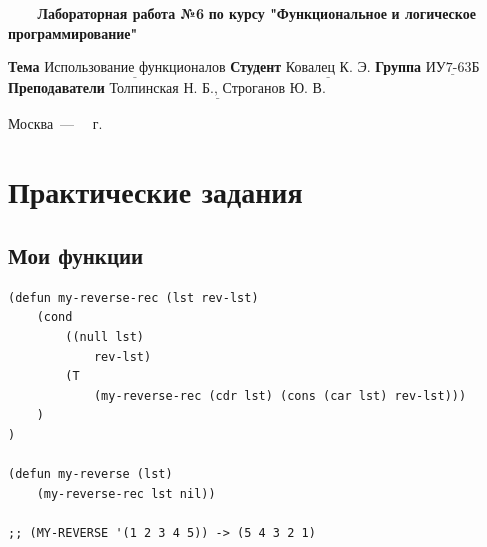 \documentclass[a4paper,14pt, unknownkeysallowed]{extreport}
\begin{document}
\begin{titlepage}
	
	\begin{center}
		\noindent\begin{minipage}{1.3\textwidth}\centering
		\Large\textbf{   ~~~ Лабораторная работа №6}\newline
		\textbf{по курсу "Функциональное}\newline
		\textbf{и логическое программирование"}\newline\newline\newline
		\end{minipage}
	\end{center}
	
	\noindent\textbf{Тема} 			$\underline{\text{Использование функционалов}}$\newline\newline
	\noindent\textbf{Студент} 		$\underline{\text{Ковалец К. Э.}}$\newline\newline
	\noindent\textbf{Группа} 		$\underline{\text{ИУ7-63Б}}$\newline\newline
	\noindent\textbf{Преподаватели} $\underline{\text{Толпинская Н. Б., Строганов Ю. В.}}$\newline
	
	\begin{center}
		\vfill
		Москва~---~\the\year
		~г.
	\end{center}
	\restoregeometry
\end{titlepage}



\setcounter{page}{2}

\chapter{Практические задания}


\section{Мои функции}

\begin{center}
\captionsetup{justification=raggedright,singlelinecheck=off}
\begin{lstlisting}[label=lst:parallel_processing,caption=my-reverse]
(defun my-reverse-rec (lst rev-lst)
	(cond 
		((null lst)
			rev-lst)
		(T 
			(my-reverse-rec (cdr lst) (cons (car lst) rev-lst)))
	)
)

(defun my-reverse (lst)
	(my-reverse-rec lst nil))

;; (MY-REVERSE '(1 2 3 4 5)) -> (5 4 3 2 1)
\end{lstlisting}
\end{center}
\end{document}
